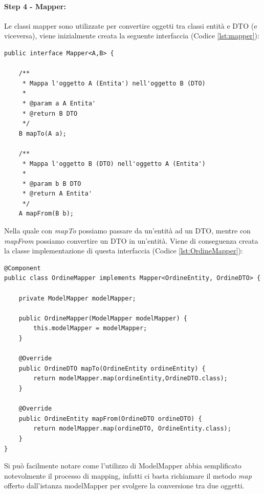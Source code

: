 \paragraph{Step 4 - Mapper:}
Le classi mapper sono utilizzate per convertire oggetti tra classi entità e DTO (e viceversa), viene inizialmente creata la seguente interfaccia (Codice \vref{lst:mapper}):
\begin{lstlisting}[style=myJava, 
    caption={Interfaccia Mapper.java}, label=lst:mapper, 
    emph={[3] A, B },
    emphstyle={[3]\color{codeCyan}},]
public interface Mapper<A,B> {

    /**
     * Mappa l'oggetto A (Entita') nell'oggetto B (DTO)
     *
     * @param a A Entita'
     * @return B DTO
     */
    B mapTo(A a);

    /**
     * Mappa l'oggetto B (DTO) nell'oggetto A (Entita')
     *
     * @param b B DTO
     * @return A Entita'
     */
    A mapFrom(B b);
\end{lstlisting}
Nella quale con \textit{mapTo} possiamo passare da un'entità ad un DTO, mentre con \textit{mapFrom} possiamo convertire un DTO in un'entità. Viene di conseguenza creata la classe implementazione di questa interfaccia (Codice \vref{lst:OrdineMapper}): 
\begin{lstlisting}[style=myJava, 
    caption={Classe OrdineMapper.java implementazione di ModelMapper.java}, label=lst:OrdineMapper, 
    emph={[2] modelMapper},
    emphstyle={[2]\color{codeDarkMagenta}},
    emph={[3] mapTo, mapFrom },
    emphstyle={[3]\color{codeCyan}},]
@Component
public class OrdineMapper implements Mapper<OrdineEntity, OrdineDTO> {

    private ModelMapper modelMapper;

    public OrdineMapper(ModelMapper modelMapper) {
        this.modelMapper = modelMapper;
    }

    @Override
    public OrdineDTO mapTo(OrdineEntity ordineEntity) {
        return modelMapper.map(ordineEntity,OrdineDTO.class);
    }

    @Override
    public OrdineEntity mapFrom(OrdineDTO ordineDTO) {
        return modelMapper.map(ordineDTO, OrdineEntity.class);
    }
}
\end{lstlisting}
Si può facilmente notare come l'utilizzo di ModelMapper abbia semplificato notevolmente il processo di mapping, infatti ci basta richiamare il metodo \textit{map} offerto dall'istanza modelMapper per svolgere la conversione tra due oggetti.
